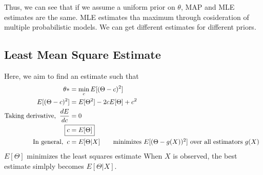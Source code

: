 \documentclass[11pt, a4paper]{article}
\begin{document}
    Thus, we can see that if we assume a uniform prior on $\theta$, MAP and MLE estimates are the same. MLE estimates tha maximum through cosideration of multiple probabilistic models. We can get different estimates for different priors.


    \subsection{Least Mean Square Estimate}
    Here, we aim to find an estimate such that
    \begin{align*}
        \theta* &= \min_{c} E[(\Theta - c)^{2}]\\
        E[(\Theta - c)^{2}] &= E[\Theta^{2}] - 2cE[\Theta] + c^{2}\\
        \text{Taking derivative,\;\;} \frac{dE}{dc} &= 0\\
        \Aboxed{c &= E[\Theta]}\\
        \text{In general,\;\;} c &= E[\Theta|X] \tag*{minimizes $E[(\Theta - g(X))^{2}]$ over all estimators $g(X)$ }
    \end{align*}
    $E[\Theta]$ minimizes the least squares estimate
    \newline
    When $X$ is observed, the best estimate simlply becomes $E[\Theta|X]$.


\end{document}
